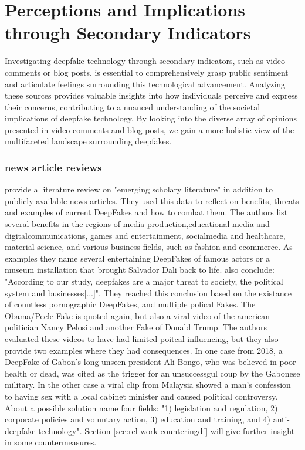 \documentclass[
  a4paper,  %
  twoside,  %
  bibliography=totoc,
  headsepline,
  cleardoublepage=empty,
  parskip=half,
  draft=false
]{scrbook}
\begin{document}
\section{Perceptions and Implications through Secondary Indicators} 
\label{sec:rel-secondary}

Investigating deepfake technology through secondary indicators, such as video comments or blog posts, is essential to comprehensively grasp public sentiment and articulate feelings surrounding this technological advancement. Analyzing these sources provides valuable insights into how individuals perceive and express their concerns, contributing to a nuanced understanding of the societal implications of deepfake technology. By looking into the diverse array of opinions presented in video comments and blog posts, we gain a more holistic view of the multifaceted landscape surrounding deepfakes.

\subsubsection*{news article reviews}
\citet{westerlundEmergenceDeepfakeTechnology2019a} provide a literature review on "emerging scholary literature" in addition to publicly available news articles. They used this data to reflect on benefits, threats and examples of current DeepFakes and how to combat them. The authors list several benefits in the regions of media production,educational media and digitalcommunications, games and entertainment, socialmedia and healthcare, material science, and various business fields, such as fashion and ecommerce. As examples they name several entertaining DeepFakes of famous actors or a museum installation that brought Salvador Dali back to life.  also conclude: "According to our study, deepfakes are a major threat to society, the political system and businesses[...]". They reached this conclusion based on the existance of countless pornographic DeepFakes, and multiple polical Fakes. The Obama/Peele Fake is quoted again, but also a viral video of the american politician Nancy Pelosi and another Fake of Donald Trump. The authors evaluated these videos to have had limited poitcal influencing, but they also provide two examples where they had consequences. In one case from 2018, a DeepFake of Gabon's long-unseen president Ali Bongo, who was believed in poor health or dead, was cited as the trigger for an unsuccessgul coup by the Gabonese military. In the other case a viral clip from Malaysia showed a man's confession to having sex with a local cabinet minister and caused political controversy. \\
About a possible solution  name four fields: "1) legislation and regulation, 2) corporate policies and voluntary action, 3) education and training, and 4) anti-deepfake technology". Section \ref{sec:rel-work-counteringdf} will give further insight in some countermeasures.
\end{document}
